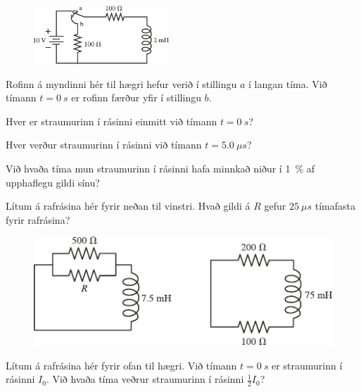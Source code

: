 \ifdefined \wholebook \else\documentclass[oneside]{book}\usepackage{EdlBook}\graphicspath{{figures/}}
\begin{document}
\begin{enumerate}[label = \textbf{(\alph*)}]

\begin{minipage}{\linewidth}
\begin{figure}
\vspace{-0.5cm}
\includegraphics[width = 2in]{figures/rks3016.pdf}
\end{figure}

\item[\textbf{(30.16)}] Rofinn á myndinni hér til hægri hefur verið í stillingu $a$ í langan tíma. Við tímann $t = \SI{0}{s}$ er rofinn færður yfir í stillingu $b$. \begin{enumerate*}[label = \textbf{(\alph*)}]
    \item Hver er straumurinn í rásinni einmitt við tímann $t = \SI{0}{s}$?
    \item Hver verður straumurinn í rásinni við tímann $t = \SI{5.0}{\mu s}$?
    \item Við hvaða tíma mun straumurinn í rásinni hafa minnkað niður í \SI{1}{\percent} af upphaflegu gildi sínu?
\end{enumerate*}

\end{minipage}

\item[\textbf{(30.34)}] Lítum á rafrásina hér fyrir neðan til vinstri. Hvað gildi á $R$ gefur $\SI{25}{\mu s}$ tímafasta fyrir rafrásina?

\begin{figure}[H]
    \centering
    \includegraphics[scale = 1.25]{figures/rk3034.pdf}
\end{figure}

\item[\textbf{(30.35)}] Lítum á rafrásina hér fyrir ofan til hægri. Við tímann $t = \SI{0}{s}$ er straumurinn í rásinni $I_0$. Við hvaða tíma veðrur straumurinn í rásinni $\frac{1}{2}I_0$?


\end{enumerate}
\end{document}

